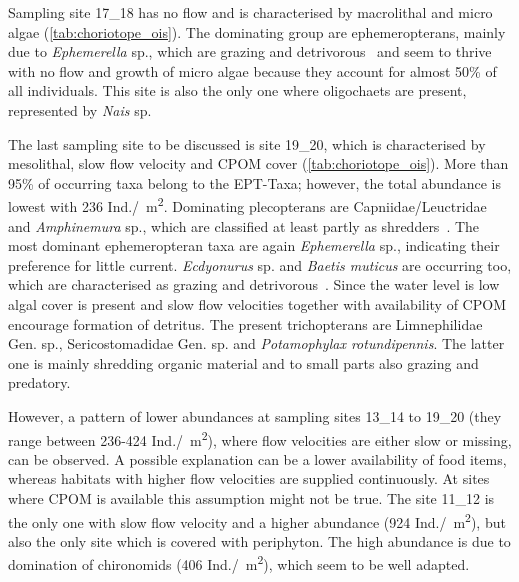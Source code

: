Sampling site 17\_18 has no flow and is characterised by macrolithal and micro algae (\cref{tab:choriotope_ois}). The dominating group are ephemeropterans, mainly due to \emph{Ephemerella} sp., which are grazing and detrivorous~ and seem to thrive with no flow and growth of micro algae because they account for almost 50\% of all individuals. This site is also the only one where oligochaets are present, represented by \emph{Nais} sp.

The last sampling site to be discussed is site 19\_20, which is characterised by mesolithal, slow flow velocity and CPOM cover (\cref{tab:choriotope_ois}). More than 95\% of occurring taxa belong to the EPT-Taxa; however, the total abundance is lowest with 236 Ind./\SI{}{\square\meter}. Dominating plecopterans are Capniidae/Leuctridae and \emph{Amphinemura} sp., which are classified at least partly as shredders~. The most dominant ephemeropteran taxa are again \emph{Ephemerella} sp., indicating their preference for little current. \emph{Ecdyonurus} sp. and \emph{Baetis muticus} are occurring too, which are characterised as grazing and detrivorous~. Since the water level is low algal cover is present and slow flow velocities together with availability of CPOM encourage formation of detritus. The present trichopterans are Limnephilidae Gen. sp., Sericostomadidae Gen. sp. and \emph{Potamophylax rotundipennis}. The latter one is mainly shredding organic material and to small parts also grazing and predatory.

However, a pattern of lower abundances at sampling sites 13\_14 to 19\_20 (they range between 236-424 Ind./\SI{}{\square\meter}), where flow velocities are either slow or missing, can be observed. A possible explanation can be a lower availability of food items, whereas habitats with higher flow velocities are supplied continuously. At sites where CPOM is available this assumption might not be true. The site 11\_12 is the only one with slow flow velocity and a higher abundance (924 Ind./\SI{}{\square\meter}), but also the only site which is covered with periphyton. The high abundance is due to domination of chironomids (406 Ind./\SI{}{\square\meter}), which seem to be well adapted.

